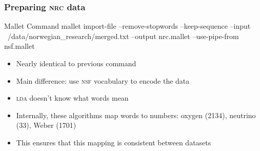 \begin{frame}
  \frametitle{Preparing \textsc{nrc} data}

  \begin{block}{Mallet Command}
    mallet import-file --remove-stopwords --keep-sequence --input ~/data/norwegian\_research/merged.txt --output nrc.mallet \alert<2>{--use-pipe-from nsf.mallet}
  \end{block}

  \begin{itemize}
    \item Nearly identical to previous command
    \pause
    \item Main difference: use \textsc{nsf} vocabulary to encode the data
    \item \textsc{lda} doesn't know what words mean
    \item Internally, these algorithms map words to numbers: oxygen (2134), neutrino (33), Weber (1701)
    \item This ensures that this mapping is consistent between datasets
   \end{itemize}

\end{frame}


